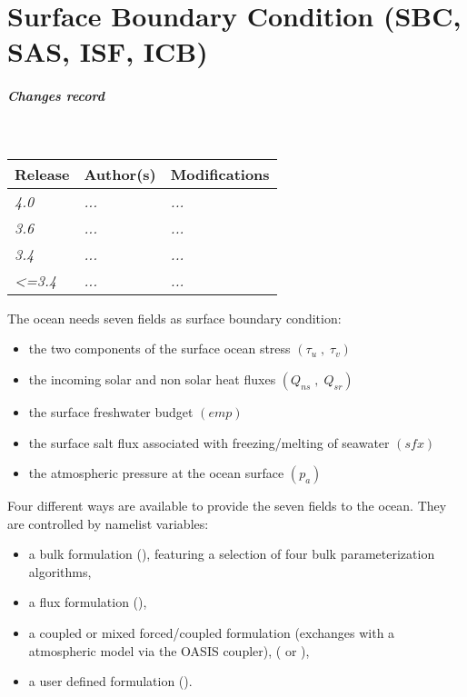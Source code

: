 \documentclass[../main/NEMO_manual]{subfiles}
\begin{document}
\chapter{Surface Boundary Condition (SBC, SAS, ISF, ICB)}
\label{chap:SBC}

\thispagestyle{plain}

\chaptertoc

\paragraph{Changes record} ~\\

{\footnotesize
  \begin{tabularx}{\textwidth}{l||X|X}
    Release & Author(s) & Modifications \\
    \hline
    {\em   4.0} & {\em ...} & {\em ...} \\
    {\em   3.6} & {\em ...} & {\em ...} \\
    {\em   3.4} & {\em ...} & {\em ...} \\
    {\em <=3.4} & {\em ...} & {\em ...}
  \end{tabularx}
}

\clearpage

\begin{listing}
  \caption{}
  \label{lst:namsbc}
\end{listing}

The ocean needs seven fields as surface boundary condition:

\begin{itemize}
\item the two components of the surface ocean stress $\left( {\tau_u \;,\;\tau_v} \right)$
\item the incoming solar and non solar heat fluxes $\left( {Q_{ns} \;,\;Q_{sr} } \right)$
\item the surface freshwater budget $\left( {\textit{emp}} \right)$
\item the surface salt flux associated with freezing/melting of seawater $\left( {\textit{sfx}} \right)$
\item the atmospheric pressure at the ocean surface $\left( p_a \right)$
\end{itemize}

Four different ways are available to provide the seven fields to the ocean. They are controlled by
namelist  variables:

\begin{itemize}
\item a bulk formulation (), featuring a selection of four bulk parameterization algorithms,
\item a flux formulation (),
\item a coupled or mixed forced/coupled formulation (exchanges with a atmospheric model via the OASIS coupler),
( or ),
\item a user defined formulation ().
\end{itemize}
\end{document}
